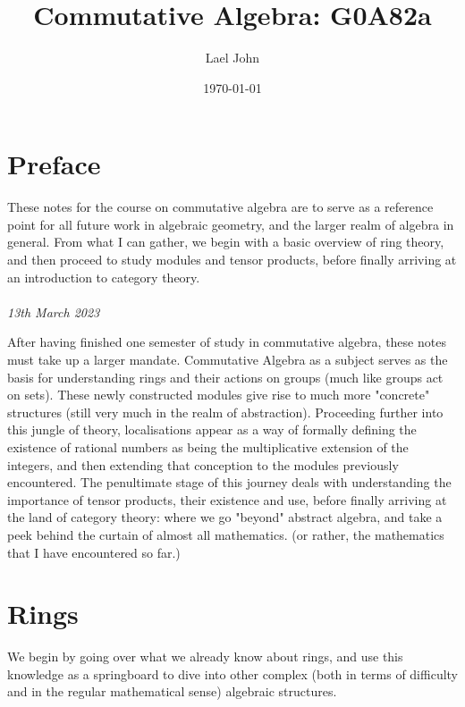 \documentclass[12pt]{book}
\date{\today}
\title{Commutative Algebra: G0A82a}
\author{Lael John}
\theoremstyle{definition}
\begin{document}
\maketitle
\chapter*{Preface}
These notes for the course on commutative algebra are to serve as a reference point for all future work in algebraic geometry, and the larger realm of algebra in general. From what I can gather, we begin with a basic overview of ring theory, and then proceed to study modules and tensor products, before finally arriving at an introduction to category theory.\\\\\textit{13th March 2023}

After having finished one semester of study in commutative algebra, these notes must take up a larger mandate. Commutative Algebra as a subject serves as the basis for understanding rings and their actions on groups (much like groups act on sets). These newly constructed modules give rise to much more "concrete" structures (still very much in the realm of abstraction). Proceeding further into this jungle of theory, localisations appear as a way of formally defining the existence of rational numbers as being the multiplicative extension of the integers, and then extending that conception to the modules previously encountered. The penultimate stage of this journey deals with understanding the importance of tensor products, their existence and use, before finally arriving at the land of category theory: where we go "beyond" abstract algebra, and take a peek behind the curtain of almost all mathematics. (or rather, the mathematics that I have encountered so far.)
\tableofcontents
\chapter{Rings}
We begin by going over what we already know about rings, and use this knowledge as a springboard to dive into other complex (both in terms of difficulty and in the regular mathematical sense) algebraic structures.
\end{document}
